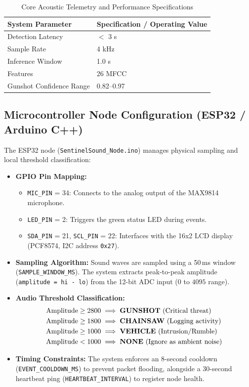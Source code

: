 \documentclass[11pt,a4paper]{article}
\begin{document}
\begin{table}[H]
    \centering
    \caption{Core Acoustic Telemetry and Performance Specifications}
    \label{tab:system_specs_synopsis}
    \small
    \begin{tabular}{ll}
        \toprule
        \textbf{System Parameter} & \textbf{Specification / Operating Value} \\
        \midrule
        Detection Latency & $<$ 3 s \\
        Sample Rate & 4 kHz \\
        Inference Window & 1.0 s \\
        Features & 26 MFCC \\
        Gunshot Confidence Range & 0.82--0.97 \\
        \bottomrule
    \end{tabular}
\end{table}

\subsection{Microcontroller Node Configuration (ESP32 / Arduino C++)}
The ESP32 node (\texttt{SentinelSound\_Node.ino}) manages physical sampling and local threshold classification:
\begin{itemize}
    \item \textbf{GPIO Pin Mapping:}
        \begin{itemize}
            \item \texttt{MIC\_PIN} = 34: Connects to the analog output of the MAX9814 microphone.
            \item \texttt{LED\_PIN} = 2: Triggers the green status LED during events.
            \item \texttt{SDA\_PIN} = 21, \texttt{SCL\_PIN} = 22: Interfaces with the 16x2 LCD display (PCF8574, I2C address \texttt{0x27}).
        \end{itemize}
    \item \textbf{Sampling Algorithm:} Sound waves are sampled using a 50\,ms window (\texttt{SAMPLE\_WINDOW\_MS}). The system extracts peak-to-peak amplitude (\texttt{amplitude = hi - lo}) from the 12-bit ADC input ($0$ to $4095$ range).
    \item \textbf{Audio Threshold Classification:}
        \begin{align*}
            \text{Amplitude} &\ge 2800 \implies \text{\textbf{GUNSHOT} (Critical threat)} \\
            \text{Amplitude} &\ge 1800 \implies \text{\textbf{CHAINSAW} (Logging activity)} \\
            \text{Amplitude} &\ge 1000 \implies \text{\textbf{VEHICLE} (Intrusion/Rumble)} \\
            \text{Amplitude} &< 1000 \implies \text{\textbf{NONE} (Ignore as ambient noise)}
        \end{align*}
    \item \textbf{Timing Constraints:} The system enforces an 8-second cooldown (\texttt{EVENT\_COOLDOWN\_MS}) to prevent packet flooding, alongside a 30-second heartbeat ping (\texttt{HEARTBEAT\_INTERVAL}) to register node health.
\end{itemize}
\end{document}
